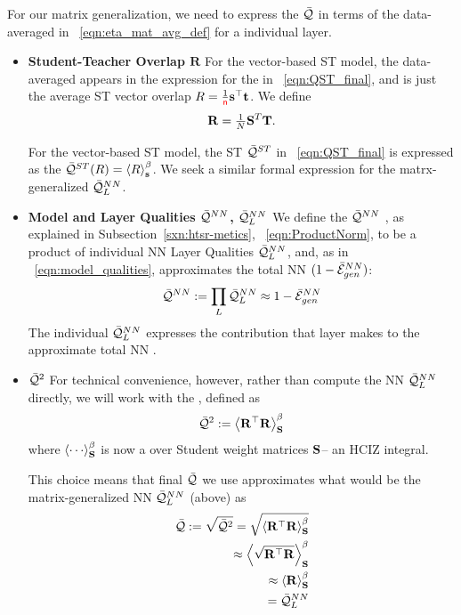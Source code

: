 For our matrix generalization, we need to express the \LayerQuality $\bar{\mathcal{Q}}$ in terms of the data-averaged
\SelfOverlap in \EQN~\ref{eqn:eta_mat_avg_def} for a individual layer.
\begin{itemize}
\item
\textbf{Student-Teacher Overlap  $\mathbf{R}$}
For the vector-based \Perceptron ST model, the data-averaged \SelfOverlap appears in the expression for the
\LayerQuality  in \EQN~\ref{eqn:QST_final}, and is just the average ST vector overlap $R=\frac{1}{{\color{red}\sf{n}}}{\mathbf{s}}^{\top}{\mathbf{t}}$. 
We define 
\begin{equation}
\mathbf{R} = \tfrac{1}{N} {\mathbf{S}}^{T} {\mathbf{T}}  .
\end{equation}

For the vector-based ST model, the ST \Quality $\bar{\mathcal{Q}}^{ST}$ in \EQN~\ref{eqn:QST_final} is expressed as
the \ThermalAverage $\bar{\mathcal{Q}}^{ST}(R)=\left\langle R \right\rangle_{\mathbf s}^{\beta}$. We seek a similar formal expression for the matrx-generalized \LayerQuality $\bar{\mathcal{Q}}^{NN}_{L}$.
\item
\textbf{Model and Layer Qualities $\bar{\mathcal{Q}}^{NN}$, $\bar{\mathcal{Q}}^{NN}_{L}$}
We define the \ModelQuality $\bar{\mathcal{Q}}^{NN}$ ,
as explained in Subsection~\ref{sxn:htsr-metics}, \EQN~\ref{eqn:ProductNorm},
to be a product of individual NN Layer Qualities $\bar{\mathcal{Q}}^{NN}_{L}$,
and, as in \EQN~\ref{eqn:model_qualities},
approximates the total NN \AverageGeneralizationAccuracy $(1-\bar{\mathcal{E}}_{gen}^{NN})$:
\begin{equation}
 \bar{\mathcal{Q}}^{NN}:=\prod_{L}\bar{\mathcal{Q}}^{NN}_{L}\approx 1-\bar{\mathcal{E}}_{gen}^{NN} 
\end{equation}
The individual $\bar{\mathcal{Q}}^{NN}_{L}$ expresses the contribution that layer makes
to the approximate total NN \AverageGeneralizationAccuracy.
\item
 \textbf{\LayerQualitySquared $\bar{\mathcal{Q}}^{2}$}
For  technical convenience, however, rather than compute
the NN \LayerQuality $\bar{\mathcal{Q}}^{NN}_{L}$ directly, we will work with the \emph{\AverageLayerQualitySquared}, 
defined as
\begin{align}
  \label{eqn:QT_1}
  \bar{\mathcal{Q}}^{2}:=\left\langle {\mathbf{R}}^{\top}\mathbf{R} \right\rangle_{\mathbf S}^{\beta}
\end{align}
where  $\THRMAVGIZ{\cdots}$ is now a \ThermalAverage over Student weight matrices ${\mathbf{S}}$--
an HCIZ integral.

This choice means that final \LayerQuality $\bar{\mathcal{Q}}$ we use approximates what would be the
matrix-generalized NN \LayerQuality $\bar{\mathcal{Q}}^{NN}_{L}$ (above) as
\begin{align}
  \label{eqn:QT_2}
  \bar{\mathcal{Q}}:=\sqrt{\bar{\mathcal{Q}}^{2}}
  =\sqrt{\left\langle {\mathbf{R}}^{\top}\mathbf{R} \right\rangle_{\mathbf S}^{\beta}} \\ \nonumber
  \approx\left\langle \sqrt{{\mathbf{R}}^{\top}\mathbf{R}} \right\rangle_{\mathbf S}^{\beta} \\ \nonumber
  \approx\left\langle \mathbf{R} \right\rangle_{\mathbf S}^{\beta} \\ \nonumber
  = \bar{\mathcal{Q}}^{NN}_{L}
\end{align}


\end{itemize}
